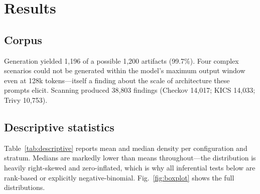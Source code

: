 \documentclass[conference]{IEEEtran}
\begin{document}
\section{Results}

\subsection{Corpus}
Generation yielded 1{,}196 of a possible 1{,}200 artifacts (99.7\%). Four
complex scenarios could not be generated within the model's maximum output
window even at 128k tokens---itself a finding about the scale of
architecture these prompts elicit. Scanning produced 38{,}803 findings
(Checkov 14{,}017; KICS 14{,}033; Trivy 10{,}753).

\subsection{Descriptive statistics}
\label{sec:descriptive}
Table~\ref{tab:descriptive} reports mean and median density per configuration and
stratum. Medians are markedly lower than means throughout---the distribution is
heavily right-skewed and zero-inflated, which is why all inferential tests below
are rank-based or explicitly negative-binomial. Fig.~\ref{fig:boxplot} shows the
full distributions.
\end{document}
